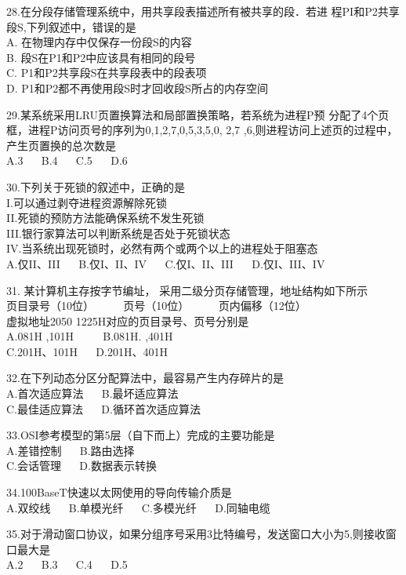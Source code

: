 28.在分段存储管理系统中，用共享段表描述所有被共享的段．若进
程PI和P2共享段S,下列叙述中，错误的是 \\
A. 在物理内存中仅保存一份段S的内容 \\
B. 段S在P1和P2中应该具有相同的段号 \\
C. P1和P2共享段S在共享段表中的段表项 \\
D. P1和P2都不再使用段S时才回收段S所占的内存空间

29.某系统采用LRU页置换算法和局部置换策略，若系统为进程P预
分配了4个页框，进程P访问页号的序列为0,1,2,7,0,5,3,5,0,
2,7 ,6,则进程访问上述页的过程中，产生页置换的总次数是 \\
A.3 $\quad$ B.4 $\quad$ C.5 $\quad$ D.6

30.下列关于死锁的叙述中，正确的是 \\
I.可以通过剥夺进程资源解除死锁 \\
II.死锁的预防方法能确保系统不发生死锁 \\
III.银行家算法可以判断系统是否处于死锁状态 \\
IV.当系统出现死锁时，必然有两个或两个以上的进程处于阻塞态 \\
A.仅II、III $\quad$ B.仅I、II、IV $\quad$ C.仅I、II、III $\quad$ D.仅I、III、IV

31. 某计算机主存按字节编址， 采用二级分页存储管理，地址结构如下所示 \\
页目录号（10位） $\qquad$ 页号（10位） $\qquad$ 页内偏移（12位） \\
虚拟地址2050 1225H对应的页目录号、页号分别是 \\
A.081H ,101H $\qquad$ B.081H. ,401H \\
C.201H、101H $\quad$ D.201H、401H

32.在下列动态分区分配算法中，最容易产生内存碎片的是 \\
A.首次适应算法 $\quad$ B.最坏适应算法 \\
C.最佳适应算法 $\quad$ D.循环首次适应算法

33.OSI参考模型的第5层（自下而上）完成的主要功能是 \\
A.差错控制 $\quad$ B.路由选择 \\
C.会话管理 $\quad$ D.数据表示转换

34.100BaseT快速以太网使用的导向传输介质是 \\
A.双绞线 $\quad$ B.单模光纤 $\quad$ C.多模光纤 $\quad$ D.同轴电缆

35.对于滑动窗口协议，如果分组序号采用3比特编号，发送窗口大小为5,则接收窗口最大是 \\
A.2 $\quad$ B.3 $\quad$ C.4 $\quad$ D.5

